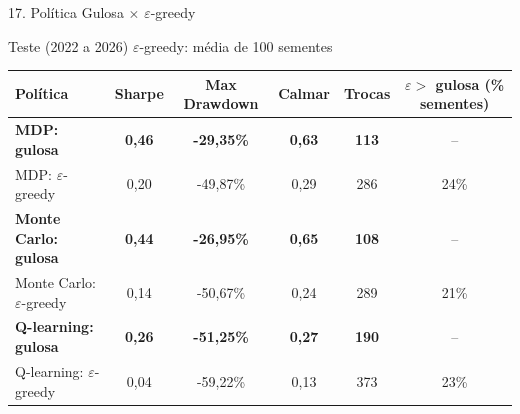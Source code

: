 \documentclass[aspectratio=169,10pt,t]{beamer}
\begin{document}
\begin{frame}{17. Política Gulosa $\times$ $\varepsilon$-greedy}
  \begin{block}{Teste (2022 a 2026) \quad $\varepsilon$-greedy: média de 100 sementes}
    \centering\scriptsize
    \setlength{\tabcolsep}{7pt}
    \renewcommand{\arraystretch}{1.0}
    \begin{tabular}{l ccccc}
      \toprule
      \textbf{Política} & \textbf{Sharpe} & \textbf{Max Drawdown} & \textbf{Calmar} & \textbf{Trocas} & \textbf{$\varepsilon >$ gulosa (\% sementes)} \\
      \midrule
      \textbf{MDP: gulosa}                    & \textbf{0,46} & \textbf{-29,35\%} & \textbf{0,63} & \textbf{113} & --          \\
      MDP: $\varepsilon$-greedy               & 0,20          & -49,87\%          & 0,29          & 286          & 24\%        \\
      \midrule
      \textbf{Monte Carlo: gulosa}            & \textbf{0,44} & \textbf{-26,95\%} & \textbf{0,65} & \textbf{108} & --          \\
      Monte Carlo: $\varepsilon$-greedy       & 0,14          & -50,67\%          & 0,24          & 289          & 21\%        \\
      \midrule
      \textbf{Q-learning: gulosa}             & \textbf{0,26} & \textbf{-51,25\%} & \textbf{0,27} & \textbf{190} & --          \\
      Q-learning: $\varepsilon$-greedy        & 0,04          & -59,22\%          & 0,13          & 373          & 23\%        \\
      \bottomrule
    \end{tabular}
  \end{block}

\end{frame}
\end{document}
